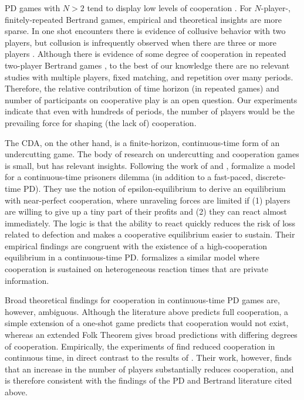 \documentclass[12pt]{article}
\begin{document}
\begin{appendices}
PD games with $N>2$ tend to display low levels of cooperation \citep[e.g.][]{Barcelo2015}. For $N$-player-, finitely-repeated Bertrand games, empirical and theoretical insights are more sparse. In one shot encounters there is evidence of collusive behavior with two players,  but collusion is infrequently observed when there are three or more players \citep{Dufwenberg2000, Abbink2005, Abbink2008, Orzen2008, Potters2013}. Although there is evidence of some degree of cooperation in repeated two-player Bertrand games \citep[see e.g.][]{Argenton2012}, to the best of our knowledge there are no relevant studies with multiple players, fixed matching, and repetition over many periods. Therefore, the relative contribution of time horizon (in repeated games) and number of participants on cooperative play is an open question. Our experiments indicate that even with hundreds of periods, the number of players would be the prevailing force for shaping (the lack of) cooperation.

The CDA, on the other hand, is a finite-horizon, continuous-time form of an undercutting game. The body of research on undercutting and cooperation games is small, but has relevant insights. Following the work of \citet{Radner1986} and \citet{Simon1989}, \citet{Friedman2012} formalize a model for a continuous-time prisoners dilemma (in addition to a fast-paced, discrete-time PD). They use the notion of epsilon-equilibrium to derive an equilibrium with near-perfect cooperation, where unraveling forces are limited if (1) players are willing to give up a tiny part of their profits and (2) they can react almost immediately. The logic is that the ability to react quickly reduces the risk of loss related to defection and makes a cooperative equilibrium easier to sustain. Their empirical findings are congruent with the existence of a high-cooperation equilibrium in a continuous-time PD. \citet{Park2014} formalizes a similar model where cooperation is sustained on heterogeneous reaction times that are private information. 

Broad theoretical findings for cooperation in continuous-time PD games are, however, ambiguous. Although the literature above predicts full cooperation, a simple extension of a one-shot game predicts that cooperation would not exist, whereas an extended Folk Theorem gives broad predictions with differing degrees of cooperation. Empirically, the experiments of \citet{Horstmann2015} find reduced cooperation in continuous time, in direct contrast to the results of \citet{Friedman2012}. Their work, however, finds that an increase in the number of players substantially reduces cooperation, and is therefore consistent with the findings of the PD and Bertrand literature cited above.


\end{appendices}
\end{document}
